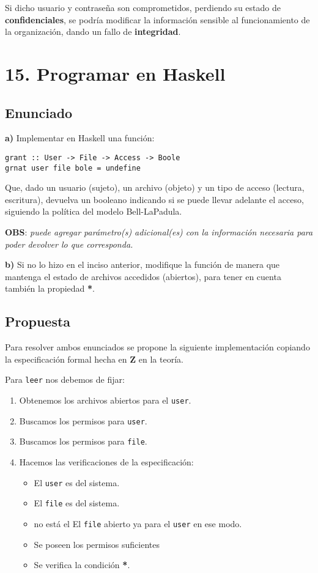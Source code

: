 \documentclass[11pt]{article}
\begin{document}
Si dicho usuario y contraseña son comprometidos, perdiendo su estado de \textbf{confidenciales}, se podría modificar la información sensible al funcionamiento de la organización, dando un fallo de \textbf{integridad}.


\section*{15. Programar en Haskell}
\subsection*{Enunciado}

\textbf{a)} Implementar en Haskell una función:
    
\begin{lstlisting}
grant :: User -> File -> Access -> Boole
grnat user file bole = undefine
\end{lstlisting}

\noindent Que, dado un usuario (sujeto), un archivo (objeto) y un tipo de acceso (lectura, escritura), devuelva un booleano indicando si se puede llevar adelante el acceso, siguiendo la política del modelo Bell-LaPadula.

\textbf{OBS}: \textit{puede agregar parámetro(s) adicional(es) con la información necesaria para poder devolver lo que corresponda.}

\textbf{b)} Si no lo hizo en el inciso anterior, modifique la función de manera que  mantenga el estado de archivos accedidos (abiertos), para tener en cuenta también la propiedad \textbf{*}.

\subsection*{Propuesta}

Para resolver ambos enunciados se propone la siguiente implementación copiando la especificación formal hecha en \textbf{Z} en la teoría.

Para \texttt{leer} nos debemos de fijar:
\begin{enumerate}
    \item Obtenemos los archivos abiertos para el \texttt{user}.
    \item Buscamos los permisos para \texttt{user}. 
    \item Buscamos los permisos para \texttt{file}. 
    \item Hacemos las verificaciones de la especificación:
        \begin{itemize}
            \item El \texttt{user} es del sistema.
            \item El \texttt{file} es del sistema.
            \item no está el El \texttt{file} abierto ya para el \texttt{user} en ese modo.
            \item Se poseen los permisos suficientes
            \item Se verifica la condición \textbf{*}. 
        \end{itemize}
\end{enumerate}
\end{document}
